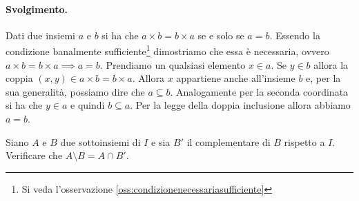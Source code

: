 \paragraph{Svolgimento.} Dati due insiemi $a$ e $b$ si ha che $a \times b = b \times a $ se e solo se $a = b$. Essendo la condizione banalmente sufficiente\footnote{Si veda l'osservazione \ref{oss:condizionenecessariasufficiente}} dimostriamo che essa è necessaria, ovvero $a \times b = b \times a \implies a=b$. Prendiamo un qualsiasi elemento $x \in a$. Se $y \in b$ allora la coppia $(x,y)\in a \times b = b \times a$. Allora $x$ appartiene anche all'insieme $b$ e, per la sua generalità, possiamo dire che $a \subseteq b$. Analogamente per la seconda coordinata si ha che $y \in a$ e quindi $b \subseteq a$. Per la legge della doppia inclusione allora abbiamo $a=b$. \hfill \blacksquare
\begin{exsbox}
	Siano $A$ e $B$ due sottoinsiemi di $I$ e sia $B'$ il complementare di $B$ rispetto a $I$. Verificare che $A \setminus B = A \cap B'$.
\end{exsbox}
